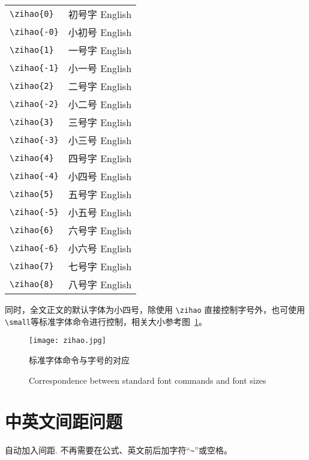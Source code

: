 \documentclass[smd,entitle,forlib,AutoFakeBold]{NJTECHMaster}
\begin{document}
\begin{tabular}{ll}
	\verb|\zihao{0}| &\zihao{0}  初号字 English \\
	\verb|\zihao{-0}|&\zihao{-0} 小初号 English \\
	\verb|\zihao{1} |&\zihao{1}  一号字 English \\
	\verb|\zihao{-1}|&\zihao{-1} 小一号 English \\
	\verb|\zihao{2} |&\zihao{2}  二号字 English \\
	\verb|\zihao{-2}|&\zihao{-2} 小二号 English \\
	\verb|\zihao{3} |&\zihao{3}  三号字 English \\
	\verb|\zihao{-3}|&\zihao{-3} 小三号 English  \\
	\verb|\zihao{4} |&\zihao{4}  四号字 English  \\
	\verb|\zihao{-4}|&\zihao{-4} 小四号 English \\
	\verb|\zihao{5} |&\zihao{5}  五号字 English \\
	\verb|\zihao{-5}|&\zihao{-5} 小五号 English \\
	\verb|\zihao{6} |&\zihao{6}  六号字 English \\
	\verb|\zihao{-6}|&\zihao{-6} 小六号 English \\
	\verb|\zihao{7} |&\zihao{7}  七号字 English \\
	\verb|\zihao{8} |&\zihao{8}  八号字 English \\
\end{tabular}

同时，全文正文的默认字体为小四号，除使用 \verb|\zihao| 直接控制字号外，也可使用\verb|\small|等标准字体命令进行控制，相关大小参考图~\ref{fig-cor-font}。

\begin{figure}[ht]
	\centering
	\texttt{[image: zihao.jpg]}
	\vspace{5pt}
	\caption{标准字体命令与字号的对应}
	\addtocounter{figure}{-1}
	\renewcommand{\figurename}{Figure}
	\caption{Correspondence between standard font commands and font sizes}
	\renewcommand{\figurename}{图}
	\label{fig-cor-font}
\end{figure}

\section{中英文间距问题}

自动加入间距. 不再需要在公式、英文前后加字符``\verb|~|''或空格。
\end{document}
